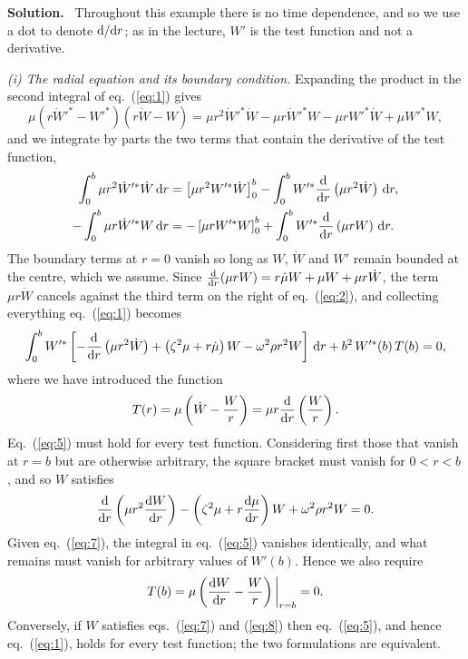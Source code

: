 \documentclass[a4paper,12pt]{paper}
\newcounter{example}
\newenvironment{solution}{\par\noindent\textbf{Solution.}\ }{\par\medskip}
\begin{document}
\begin{solution}
Throughout this example there is no time dependence, and so we use a dot to denote
$\mathrm{d}/\mathrm{d} r$; as in the lecture, $W'$ is the test function and not a derivative.

\medskip
\noindent\textit{(i) The radial equation and its boundary condition.}
Expanding the product in the second integral of eq.~(\ref{eq:1}) gives
\begin{equation}
\mu\left(r\dot{W}'^{*}-W'^{*}\right)\left(r\dot{W}-W\right)
=\mu r^{2}\dot{W}'^{*}\dot{W}-\mu r\dot{W}'^{*}W-\mu rW'^{*}\dot{W}+\mu W'^{*}W,
\label{eq:2}
\end{equation}
and we integrate by parts the two terms that contain the derivative of the test function,
\begin{align}
\int_{0}^{b}\mu r^{2}\dot{W}'^{*}\dot{W}\,\mathrm{d} r&=\left[\mu r^{2}W'^{*}\dot{W}\right]_{0}^{b}
-\int_{0}^{b}W'^{*}\frac{\mathrm{d}}{\mathrm{d} r}\left(\mu r^{2}\dot{W}\right)\,\mathrm{d} r,\label{eq:3}\\
-\int_{0}^{b}\mu r\dot{W}'^{*}W\,\mathrm{d} r&=-\left[\mu rW'^{*}W\right]_{0}^{b}
+\int_{0}^{b}W'^{*}\frac{\mathrm{d}}{\mathrm{d} r}\left(\mu rW\right)\,\mathrm{d} r.\label{eq:4}
\end{align}
The boundary terms at $r=0$ vanish so long as $W$, $\dot{W}$ and $W'$ remain bounded at the
centre, which we assume. Since $\frac{\mathrm{d}}{\mathrm{d} r}(\mu rW)=r\dot{\mu}W+\mu W+\mu r\dot{W}$,
the term $\mu r\dot{W}$ cancels against the third term on the right of eq.~(\ref{eq:2}), and
collecting everything eq.~(\ref{eq:1}) becomes
\begin{equation}
\int_{0}^{b}W'^{*}\left[-\frac{\mathrm{d}}{\mathrm{d} r}\left(\mu r^{2}\dot{W}\right)
+\left(\zeta^{2}\mu+r\dot{\mu}\right)W-\omega^{2}\rho r^{2}W\right]\,\mathrm{d} r
+b^{2}\,W'^{*}(b)\,T(b)=0,
\label{eq:5}
\end{equation}
where we have introduced the function
\begin{equation}
T(r)=\mu\left(\dot{W}-\frac{W}{r}\right)=\mu r\frac{\mathrm{d}}{\mathrm{d} r}\left(\frac{W}{r}\right).
\label{eq:6}
\end{equation}
Eq.~(\ref{eq:5}) must hold for every test function. Considering first those that vanish at
$r=b$ but are otherwise arbitrary, the square bracket must vanish for $0<r<b$, and so $W$
satisfies
\begin{equation}
\frac{\mathrm{d}}{\mathrm{d} r}\left(\mu r^{2}\frac{\mathrm{d} W}{\mathrm{d} r}\right)
-\left(\zeta^{2}\mu+r\frac{\mathrm{d}\mu}{\mathrm{d} r}\right)W+\omega^{2}\rho r^{2}W=0.
\label{eq:7}
\end{equation}
Given eq.~(\ref{eq:7}), the integral in eq.~(\ref{eq:5}) vanishes identically, and what
remains must vanish for arbitrary values of $W'(b)$. Hence we also require
\begin{equation}
T(b)=\mu\left(\frac{\mathrm{d} W}{\mathrm{d} r}-\frac{W}{r}\right)\bigg|_{r=b}=0.
\label{eq:8}
\end{equation}
Conversely, if $W$ satisfies eqs.~(\ref{eq:7}) and (\ref{eq:8}) then eq.~(\ref{eq:5}), and
hence eq.~(\ref{eq:1}), holds for every test function; the two formulations are equivalent.


\end{solution}
\end{document}
